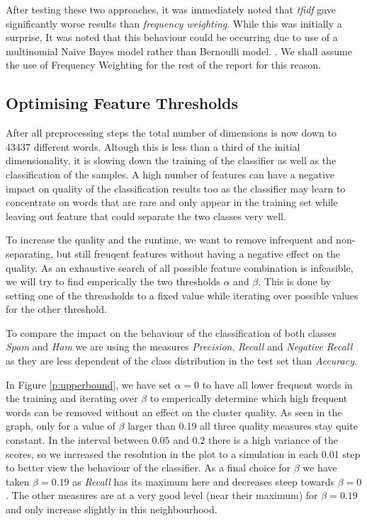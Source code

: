 After testing these two approaches, it was immediately noted that \emph{tfidf} gave significantly worse results than \emph{frequency weighting}. While this was initially a surprise, It was noted that this behaviour could be occurring due to use of a multinomial Naive Bayes model rather than Bernoulli model. . We shall assume the use of Frequency Weighting for the rest of the report for this reason.

\subsection{Optimising Feature Thresholds}
\label{sec:featurethresholds}

After all preprocessing steps the total number of dimensions is now down to 43437 different words.
Altough this is less than a third of the initial dimensionality, it is slowing down the training of the classifier as well as the classification of the samples.
A high number of features can have a negative impact on quality of the classification results too as the classifier may learn to concentrate on words that are rare and only appear in the training set while leaving out feature that could separate the two classes very well.

To increase the quality and the runtime, we want to remove infrequent and non-separating, but still freuqent features without having a negative effect on the quality.
As an exhaustive search of all possible feature combination is infeasible, we will try to find emperically the two thresholds $\alpha$ and $\beta$.
This is done by setting one of the threasholds to a fixed value while iterating over possible values for the other threshold.



To compare the impact on the behaviour of the classification of both classes \emph{Spam} and \emph{Ham} we are using the measures \emph{Precision}, \emph{Recall} and \emph{Negative Recall} as they are less dependent of the class distribution in the test set than \emph{Accuracy}.

In Figure \ref{p:upperbound}, we have set $\alpha = 0$ to have all lower frequent words in the training and iterating over $\beta$ to emperically determine which high frequent words can be removed without an effect on the cluster quality.
As seen in the graph, only for a value of $\beta$ larger than 0.19 all three quality measures stay quite constant.
In the interval between $0.05$ and $0.2$ there is a high variance of the scores, so we increased the resolution in the plot to a simulation in each 0.01 step to better view the behaviour of the classifier.
As a final choice for $\beta$ we have taken $\beta = 0.19$ as \emph{Recall} has its maximum here and decreases steep towards $\beta = 0$.
The other measures are at a very good level (near their maximum) for $\beta = 0.19$ and only increase slightly in this neighbourhood.





